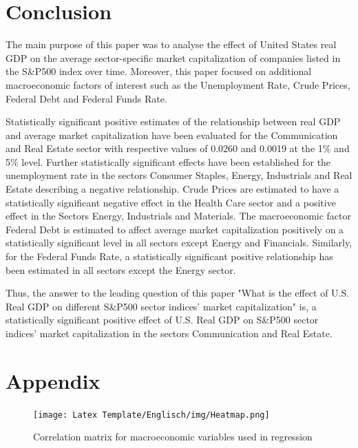 \documentclass[a4paper,12pt]{article}
\begin{document}
\clearpage
\section{Conclusion}

The main purpose of this paper was to analyse the effect of United States real GDP on the average sector-specific market capitalization of companies listed in the S\&P500 index over time. Moreover, this paper focused on additional macroeconomic factors of interest such as the Unemployment Rate, Crude Prices, Federal Debt and Federal Funds Rate. 

\noindent Statistically significant positive estimates of the relationship between real GDP and average market capitalization have been evaluated for the Communication and Real Estate sector with respective values of 0.0260 and 0.0019 at the 1$\%$ and 5$\%$ level. Further statistically significant effects have been established for the unemployment rate in the sectors Consumer Staples, Energy, Industrials and Real Estate describing a negative relationship. Crude Prices are estimated to have a statistically significant negative effect in the Health Care sector and a positive effect in the Sectors Energy, Industrials and Materials. The macroeconomic factor Federal Debt is estimated to affect average market capitalization positively on a statistically significant level in all sectors except Energy and Financials. Similarly, for the Federal Funds Rate, a statistically significant positive relationship has been estimated in all sectors except the Energy sector.

\noindent Thus, the answer to the leading question of this paper "What is the effect of U.S. Real GDP on different S\&P500 sector indices' market capitalization" is, a statistically significant positive effect of U.S. Real GDP on S\&P500 sector indices' market capitalization in the sectors Communication and Real Estate. 



\clearpage

	
	


\clearpage



\clearpage
\section{Appendix}

\begin{figure}[!h]
  \centering
    \texttt{[image: Latex Template/Englisch/img/Heatmap.png]}
    \caption{Correlation matrix for macroeconomic variables used in regression}
    \hfill
\end{figure}
\end{document}
